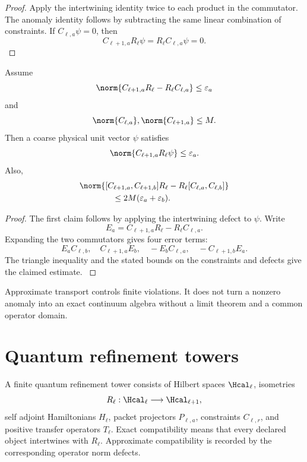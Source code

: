 \begin{proof}\label{strong:proof:071}
Apply the intertwining identity twice to each product in the commutator. The anomaly identity follows by subtracting the same linear combination of constraints. If \(C_{\ell,a}\psi=0\), then
\[
C_{\ell+1,a}R_\ell\psi=R_\ell C_{\ell,a}\psi=0.
\]
\label{strong:proof:071:end}\end{proof}

\begin{proposition}\label{strong:proposition:012}\label{strong:prop:approx_constraint_transport}
Assume
\[
\norm{C_{\ell+1,a}R_\ell-R_\ell C_{\ell,a}}
\leq\varepsilon_a
\]
and
\[
\norm{C_{\ell,a}},\norm{C_{\ell+1,a}}\leq M.
\]
Then a coarse physical unit vector \(\psi\) satisfies
\[
\norm{C_{\ell+1,a}R_\ell\psi}\leq\varepsilon_a.
\]
Also,
\[
\begin{aligned}
&\norm{
[C_{\ell+1,a},C_{\ell+1,b}]R_\ell
-R_\ell[C_{\ell,a},C_{\ell,b}]
}\\
&\hspace{4em}\leq
2M(\varepsilon_a+\varepsilon_b).
\end{aligned}
\]
\end{proposition}

\begin{proof}\label{strong:proof:072}
The first claim follows by applying the intertwining defect to \(\psi\). Write
\[
E_a=C_{\ell+1,a}R_\ell-R_\ell C_{\ell,a}.
\]
Expanding the two commutators gives four error terms:
\[
E_aC_{\ell,b},
\quad
C_{\ell+1,a}E_b,
\quad
-E_bC_{\ell,a},
\quad
-C_{\ell+1,b}E_a.
\]
The triangle inequality and the stated bounds on the constraints and defects give the claimed estimate.
\label{strong:proof:072:end}\end{proof}

Approximate transport controls finite violations. It does not turn a nonzero anomaly into an exact continuum algebra without a limit theorem and a common operator domain.

\section{Quantum refinement towers}\label{strong:section:013}\label{strong:sec:towers}

\begin{definition}\label{strong:definition:010}\label{strong:def:quantum_tower}
A finite quantum refinement tower consists of Hilbert spaces \(\Hcal_\ell\), isometries
\[
R_\ell:\Hcal_\ell\longrightarrow\Hcal_{\ell+1},
\]
self adjoint Hamiltonians \(H_\ell\), packet projectors \(P_{\ell,a}\), constraints \(C_{\ell,r}\), and positive transfer operators \(T_\ell\). Exact compatibility means that every declared object intertwines with \(R_\ell\). Approximate compatibility is recorded by the corresponding operator norm defects.
\end{definition}

